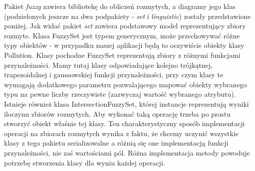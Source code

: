 \documentclass{classrep}
\begin{document}
{{            Pakiet \emph{fuzzy} zawiera bibliotekę do obliczeń rozmytych, a diagramy jego klas (podzielonych jeszcze na
            dwa podpakiety - \emph{set} i \emph{linguistic}) zostały przedstawione poniżej. Jak widać pakiet \emph{set}
            zawiera podstawowy model reprezentujący zbiory rozmyte. Klasa FuzzySet jest typem generycznym, może przechowywać
            różne typy obiektów - w przypadku naszej aplikacji będą to oczywiście obiekty klasy Pollution. Klasy pochodne
            FuzzySet reprezentują zbiory z różnymi funkcjami przynależności. Mamy tutaj klasy odpowiadające kolejno
            trójkątnej, trapezoidalnej i gaussowskiej funkcji przynależności, przy czym klasy te wymagają dodatkowego
            parametru pozwalającego mapować obiekty wybranego typu na pewne liczby rzeczywiste (zazwyczaj wartość wybranego
            atrybutu). Istnieje również klasa IntersectionFuzzySet, której instancje reprezentują wyniki iloczynu zbiorów
            rozmytych. Aby wykonać taką operację trzeba po prostu stworzyć obiekt właśnie tej klasy. Ten charakterystyczny
            sposób implementacji operacji na zbiorach rozmytych wynika z faktu, że chcemy uczynić wszystkie klasy z tego
            pakietu serializowalne a różnią się one implementacją funkcji przynależności, nie zaś wartościami pól. Różna
            implementacja metody powoduje potrzebę stworzenia klasy dla wyniu każdej operacji.

}}
\end{document}

